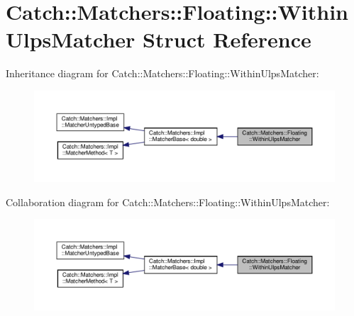 \hypertarget{structCatch_1_1Matchers_1_1Floating_1_1WithinUlpsMatcher}{}\section{Catch\+:\+:Matchers\+:\+:Floating\+:\+:Within\+Ulps\+Matcher Struct Reference}
\label{structCatch_1_1Matchers_1_1Floating_1_1WithinUlpsMatcher}


Inheritance diagram for Catch\+:\+:Matchers\+:\+:Floating\+:\+:Within\+Ulps\+Matcher\+:
\nopagebreak
\begin{figure}[H]
\begin{center}
\leavevmode
\includegraphics[width=350pt]{structCatch_1_1Matchers_1_1Floating_1_1WithinUlpsMatcher__inherit__graph}
\end{center}
\end{figure}


Collaboration diagram for Catch\+:\+:Matchers\+:\+:Floating\+:\+:Within\+Ulps\+Matcher\+:
\nopagebreak
\begin{figure}[H]
\begin{center}
\leavevmode
\includegraphics[width=350pt]{structCatch_1_1Matchers_1_1Floating_1_1WithinUlpsMatcher__coll__graph}
\end{center}
\end{figure}
